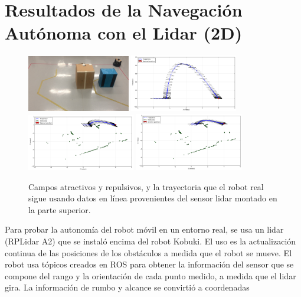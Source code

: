 \section{Resultados de la Navegación Autónoma con el Lidar (2D)}
\begin{figure}%
  \centering \footnotesize
  \includegraphics[width=0.40\textwidth]{images/kobuki_201.jpg}
  \includegraphics[width=0.42\textwidth]{images/fattr_lidar.png}
  \includegraphics[width=0.42\textwidth]{images/frep_lidar.png}
  \includegraphics[width=0.42\textwidth]{images/fnav_lidar.png}
  \captionsetup{font=footnotesize}
  \caption{Campos atractivos y repulsivos, y la trayectoria que el robot real sigue 
  usando datos en línea provenientes del sensor lidar montado en la parte superior.}
  \label{f:kbki_autonomo}
\end{figure}
Para probar la autonomía del robot móvil en un entorno real, se usa un lidar (RPLidar A2) 
que se instaló encima del robot Kobuki. El uso es la actualización continua de las posiciones 
de los obstáculos a medida que el robot se mueve. El robot usa tópicos creados en ROS para 
obtener la información del sensor que se compone del rango y la orientación de cada punto 
medido, a medida que el lidar gira. La información de rumbo y alcance se convirtió a coordenadas 
